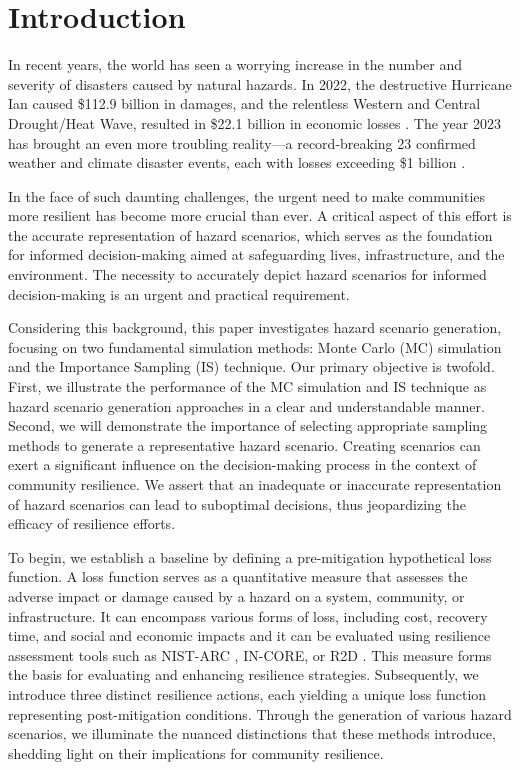 \section{Introduction}
    In recent years, the world has seen a worrying increase in the number and severity of disasters caused by natural hazards. In 2022, the destructive Hurricane Ian caused  \$112.9 billion in damages, and the relentless Western and Central Drought/Heat Wave, resulted in \$22.1 billion in economic losses \cite{noaa_billion-dollar_2023}. The year 2023 has brought an even more troubling reality—a record-breaking 23 confirmed weather and climate disaster events, each with losses exceeding \$1 billion \cite{noaa_assessing_2023}.
    
    In the face of such daunting challenges, the urgent need to make communities more resilient has become more crucial than ever. A critical aspect of this effort is the accurate representation of hazard scenarios, which serves as the foundation for informed decision-making aimed at safeguarding lives, infrastructure, and the environment. The necessity to accurately depict hazard scenarios for informed decision-making is an urgent and practical requirement. 
    
    Considering this background, this paper investigates hazard scenario generation, focusing on two fundamental simulation methods: Monte Carlo (MC) simulation and the Importance Sampling (IS) technique. Our primary objective is twofold. First, we illustrate the performance of the MC simulation and IS technique as hazard scenario generation approaches in a clear and understandable manner. Second, we will demonstrate the importance of selecting appropriate sampling methods to generate a representative hazard scenario. Creating scenarios can exert a significant influence on the decision-making process in the context of community resilience. We assert that an inadequate or inaccurate representation of hazard scenarios can lead to suboptimal decisions, thus jeopardizing the efficacy of resilience efforts.

    To begin, we establish a baseline by defining a pre-mitigation hypothetical loss function. A loss function serves as a quantitative measure that assesses the adverse impact or damage caused by a hazard on a system, community, or infrastructure. It can encompass various forms of loss, including cost, recovery time, and social and economic impacts and it can be evaluated using resilience assessment tools such as NIST-ARC \cite{harrison_nist_2023,faiz_risk-averse_2024}, IN-CORE, or R2D \cite{mckenna_nheri-simcenterr2dtool_2024}. This measure forms the basis for evaluating and enhancing resilience strategies. Subsequently, we introduce three distinct resilience actions, each yielding a unique loss function representing post-mitigation conditions. Through the generation of various hazard scenarios, we illuminate the nuanced distinctions that these methods introduce, shedding light on their implications for community resilience.
    
